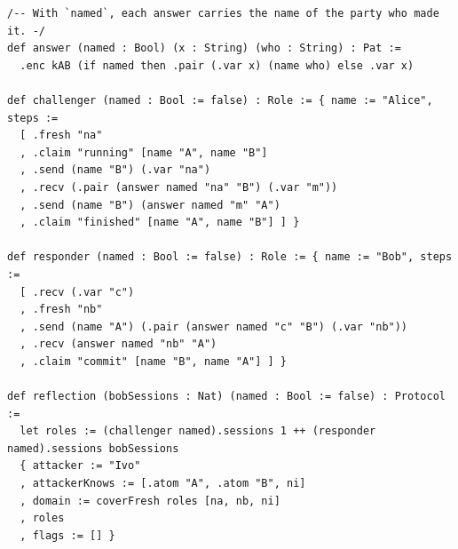 \begin{lstlisting}[language={}]
/-- With `named`, each answer carries the name of the party who made it. -/
def answer (named : Bool) (x : String) (who : String) : Pat :=
  .enc kAB (if named then .pair (.var x) (name who) else .var x)

def challenger (named : Bool := false) : Role := { name := "Alice", steps :=
  [ .fresh "na"
  , .claim "running" [name "A", name "B"]
  , .send (name "B") (.var "na")
  , .recv (.pair (answer named "na" "B") (.var "m"))
  , .send (name "B") (answer named "m" "A")
  , .claim "finished" [name "A", name "B"] ] }

def responder (named : Bool := false) : Role := { name := "Bob", steps :=
  [ .recv (.var "c")
  , .fresh "nb"
  , .send (name "A") (.pair (answer named "c" "B") (.var "nb"))
  , .recv (answer named "nb" "A")
  , .claim "commit" [name "B", name "A"] ] }

def reflection (bobSessions : Nat) (named : Bool := false) : Protocol :=
  let roles := (challenger named).sessions 1 ++ (responder named).sessions bobSessions
  { attacker := "Ivo"
  , attackerKnows := [.atom "A", .atom "B", ni]
  , domain := coverFresh roles [na, nb, ni]
  , roles
  , flags := [] }
\end{lstlisting}
